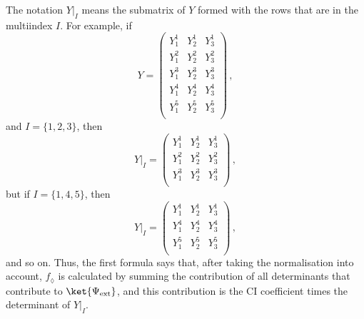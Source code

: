 \documentclass[a4paper,11pt]{article}
\begin{document}
The notation $Y\big|_I$ means the submatrix of $Y$ formed with the rows that are in the multiindex $I$.
For example, if
\begin{equation}
  Y =
  \begin{pmatrix}
    Y^1_1 & Y^1_2 & Y^1_3\\
    Y^2_1 & Y^2_2 & Y^2_3\\
    Y^3_1 & Y^3_2 & Y^3_3\\
    Y^4_1 & Y^4_2 & Y^4_3\\
    Y^5_1 & Y^5_2 & Y^5_3\\
  \end{pmatrix}\,,
\end{equation}
and $I=\{1, 2, 3\}$, then
\begin{equation}
  Y\big|_I =
  \begin{pmatrix}
    Y^1_1 & Y^1_2 & Y^1_3\\
    Y^2_1 & Y^2_2 & Y^2_3\\
    Y^3_1 & Y^3_2 & Y^3_3\\
  \end{pmatrix}\,,
\end{equation}
but if $I=\{1, 4, 5\}$, then
\begin{equation}
  Y\big|_I =
  \begin{pmatrix}
    Y^1_1 & Y^1_2 & Y^1_3\\
    Y^4_1 & Y^4_2 & Y^4_3\\
    Y^5_1 & Y^5_2 & Y^5_3\\
  \end{pmatrix}\,,
\end{equation}
and so on.
Thus, the first formula says that, after taking the normalisation into account, $f_\lozenge$ is calculated by summing the contribution of all determinants that contribute to $\ket{\Psi_\text{ext}}$, and this contribution is the CI coefficient times the determinant of $Y\big|_I$.
\end{document}
